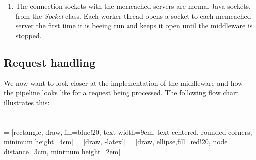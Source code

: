 \documentclass[11pt,a4paper]{article}
\begin{document}
\begin{enumerate}[ {(}1{)} ]
\item The connection sockets with the memcached servers are normal Java sockets, from the \textit{Socket} class. Each worker thread opens a socket to each memcached server the first time it is beeing run and keeps it open until the middleware is stopped.  
\end{enumerate}

\subsection{Request handling}
We now want to look closer at the implementation of the middleware and how the pipeline looks like for a request being processed. The following flow chart illustrates this:
\\
\\\\
 = [rectangle, draw, fill=blue!20, 
    text width=9em, text centered, rounded corners, minimum height=4em]
 = [draw, -latex']
 = [draw, ellipse,fill=red!20, node distance=3cm,
    minimum height=2em]   
\end{document}
